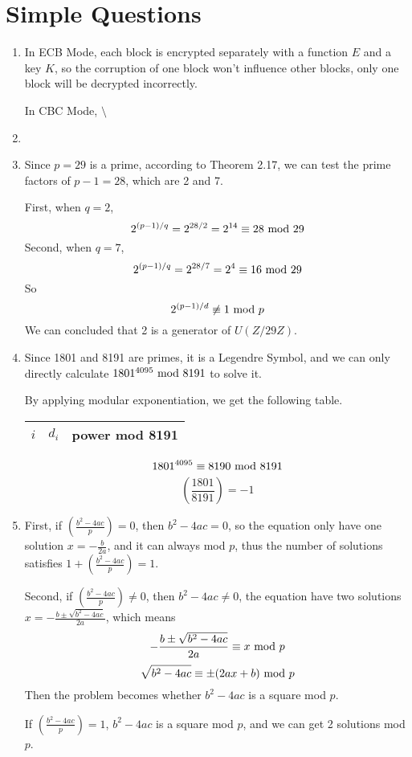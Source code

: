 \documentclass{article}
\renewcommand{\mod}{{\rm\ mod\ }}
\begin{document}
\section{Simple Questions}
\begin{enumerate}
\item
In ECB Mode, each block is encrypted separately with a function $E$ and a key $K$, so the corruption of one block won't influence other blocks, only one block will be decrypted incorrectly.

In CBC Mode, $\setminus$
\item

\item
Since $p=29$ is a prime, according to Theorem 2.17, we can test the prime factors of $p-1=28$, which are 2 and 7. 

First, when $q=2$, $$2^{(p-1)/q}=2^{28/2}=2^{14}\equiv28\mod 29$$
Second, when $q=7$, $$2^{(p-1)/q}=2^{28/7}=2^{4}\equiv16\mod 29$$
So $$2^{(p-1)/d}\not\equiv1\mod p$$
We can concluded that 2 is a generator of $U(Z/29Z)$.

\item
Since 1801 and 8191 are primes, it is a Legendre Symbol, and we can only directly calculate $1801^{4095}\mod8191$ to solve it.

By applying modular exponentiation, we get the following table.
\begin{center}
\begin{tabular}{ccc}
$i$ & $d_i$ & power mod 8191 \\\hline

\end{tabular}
\end{center}
$$1801^{4095}\equiv8190\mod8191$$
$$\left(\frac{1801}{8191}\right)=-1$$

\item
First, if $\left(\frac{b^2-4ac}{p}\right)=0$, then $b^2-4ac=0$, so the equation only have one solution $x=-\frac{b}{2a}$, and it can always mod $p$, thus the number of solutions satisfies $1+\left(\frac{b^2-4ac}{p}\right)=1$.

Second, if $\left(\frac{b^2-4ac}{p}\right)\neq0$, then $b^2-4ac\neq0$, the equation have two solutions $x=-\frac{b\pm\sqrt{b^2-4ac}}{2a}$, which means
$$-\frac{b\pm\sqrt{b^2-4ac}}{2a}\equiv x\mod p$$
$$\sqrt{b^2-4ac}\equiv \pm(2ax+b)\mod p$$
Then the problem becomes whether $b^2-4ac$ is a square mod $p$.

If $\left(\frac{b^2-4ac}{p}\right)=1$, $b^2-4ac$ is a square mod $p$, and we can get 2 solutions mod $p$.


\end{enumerate}
\end{document}
